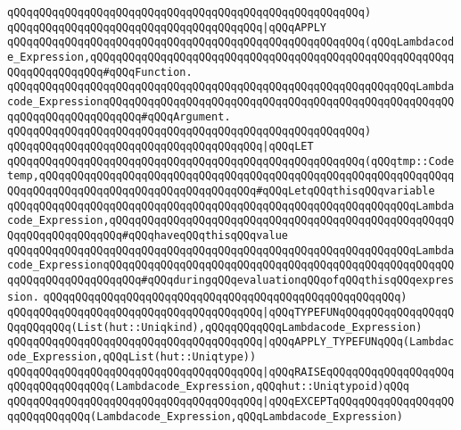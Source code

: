 \verb|qQQqqQQqqQQqqQQqqQQqqQQqqQQqqQQqqQQqqQQqqQQqqQQqqQQqqQQq)|\newline
\newline
\verb|qQQqqQQqqQQqqQQqqQQqqQQqqQQqqQQqqQQqqQQq|\verb#|qQQqAPPLY#\newline
\verb|qQQqqQQqqQQqqQQqqQQqqQQqqQQqqQQqqQQqqQQqqQQqqQQqqQQqqQQq(qQQqLambdacode_Expression,qQQqqQQqqQQqqQQqqQQqqQQqqQQqqQQqqQQqqQQqqQQqqQQqqQQqqQQqqQQqqQQqqQQqqQQq#qQQqFunction.|\newline
\verb|qQQqqQQqqQQqqQQqqQQqqQQqqQQqqQQqqQQqqQQqqQQqqQQqqQQqqQQqqQQqqQQqLambdacode_ExpressionqQQqqQQqqQQqqQQqqQQqqQQqqQQqqQQqqQQqqQQqqQQqqQQqqQQqqQQqqQQqqQQqqQQqqQQqqQQq#qQQqArgument.|\newline
\verb|qQQqqQQqqQQqqQQqqQQqqQQqqQQqqQQqqQQqqQQqqQQqqQQqqQQqqQQq)|\newline
\newline
\verb|qQQqqQQqqQQqqQQqqQQqqQQqqQQqqQQqqQQqqQQq|\verb#|qQQqLET#\newline
\verb|qQQqqQQqqQQqqQQqqQQqqQQqqQQqqQQqqQQqqQQqqQQqqQQqqQQqqQQq(qQQqtmp::Codetemp,qQQqqQQqqQQqqQQqqQQqqQQqqQQqqQQqqQQqqQQqqQQqqQQqqQQqqQQqqQQqqQQqqQQqqQQqqQQqqQQqqQQqqQQqqQQqqQQqqQQqqQQq#qQQqLetqQQqthisqQQqvariable|\newline
\verb|qQQqqQQqqQQqqQQqqQQqqQQqqQQqqQQqqQQqqQQqqQQqqQQqqQQqqQQqqQQqqQQqLambdacode_Expression,qQQqqQQqqQQqqQQqqQQqqQQqqQQqqQQqqQQqqQQqqQQqqQQqqQQqqQQqqQQqqQQqqQQqqQQq#qQQqhaveqQQqthisqQQqvalue|\newline
\verb|qQQqqQQqqQQqqQQqqQQqqQQqqQQqqQQqqQQqqQQqqQQqqQQqqQQqqQQqqQQqqQQqLambdacode_ExpressionqQQqqQQqqQQqqQQqqQQqqQQqqQQqqQQqqQQqqQQqqQQqqQQqqQQqqQQqqQQqqQQqqQQqqQQqqQQq#qQQqduringqQQqevaluationqQQqofqQQqthisqQQqexpression.|\newline
\verb|qQQqqQQqqQQqqQQqqQQqqQQqqQQqqQQqqQQqqQQqqQQqqQQqqQQqqQQq)|\newline
\newline
\verb|qQQqqQQqqQQqqQQqqQQqqQQqqQQqqQQqqQQqqQQq|\verb#|qQQqTYPEFUNqQQqqQQqqQQqqQQqqQQqqQQqqQQq(List(hut::Uniqkind),qQQqqQQqqQQqLambdacode_Expression)#\newline
\verb|qQQqqQQqqQQqqQQqqQQqqQQqqQQqqQQqqQQqqQQq|\verb#|qQQqAPPLY_TYPEFUNqQQq(Lambdacode_Expression,qQQqList(hut::Uniqtype))#\newline
\newline
\verb|qQQqqQQqqQQqqQQqqQQqqQQqqQQqqQQqqQQqqQQq|\verb#|qQQqRAISEqQQqqQQqqQQqqQQqqQQqqQQqqQQqqQQqqQQq(Lambdacode_Expression,qQQqhut::Uniqtypoid)qQQq#\newline
\verb|qQQqqQQqqQQqqQQqqQQqqQQqqQQqqQQqqQQqqQQq|\verb#|qQQqEXCEPTqQQqqQQqqQQqqQQqqQQqqQQqqQQqqQQq(Lambdacode_Expression,qQQqLambdacode_Expression)#\newline
